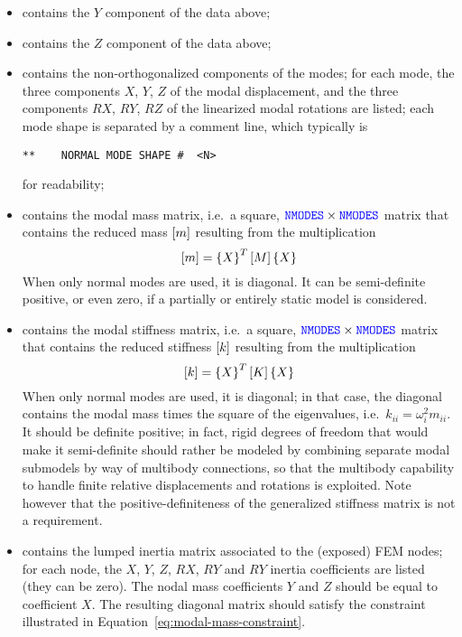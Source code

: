 \begin{itemize}
\item {} contains the $Y$ component of the data above;

\item {} contains the $Z$ component of the data above;

\item {} contains the non-orthogonalized components 
of the  modes; for each mode, the three components 
$X$, $Y$, $Z$ of the modal displacement, and the three components
$RX$, $RY$, $RZ$ of the linearized modal rotations are listed;
each mode shape is separated by a comment line, which typically is
\begin{verbatim}
**    NORMAL MODE SHAPE #  <N>
\end{verbatim}
for readability;

\item {} contains the modal mass matrix,
i.e.\ a square, $\textcolor{blue}{\texttt{NMODES}} \times \textcolor{blue}{\texttt{NMODES}}$ matrix that contains
the reduced mass $\left[ m \right]$ resulting from the multiplication
\begin{equation}
	\label{eq:modal-mass-constraint}
	\left[ m \right] = \left\{ X \right\}^T \left[ M \right] \left\{ X \right\}
\end{equation}
When only normal modes are used, it is diagonal.
It can be semi-definite positive, or even zero, if a partially 
or entirely static model is considered.

\item {} contains the modal stiffness matrix,
i.e.\ a square, $\textcolor{blue}{\texttt{NMODES}} \times \textcolor{blue}{\texttt{NMODES}}$ matrix that contains
the reduced stiffness $\left[ k \right]$ resulting from the multiplication
\begin{equation}
	\left[ k \right] = \left\{ X \right\}^T \left[ K \right] \left\{ X \right\}
\end{equation}
When only normal modes are used, it is diagonal; in that case,
the diagonal contains the modal mass times the square 
of the eigenvalues, i.e.\ $k_{ii} = \omega_i^2 m_{ii}$.
It should be definite positive; in fact, rigid degrees of freedom
that would make it semi-definite should rather be modeled by combining
separate modal submodels by way of multibody connections, so that
the multibody capability to handle finite relative displacements
and rotations is exploited.
Note however that the positive-definiteness of the generalized
stiffness matrix is not a requirement.

\item {} contains the lumped inertia matrix
associated to the  (exposed) FEM nodes;
for each node, the $X$, $Y$, $Z$, $RX$, $RY$ and $RY$ inertia
coefficients are listed (they can be zero).
The nodal mass coefficients $Y$ and $Z$ should be equal
to coefficient $X$.
The resulting diagonal matrix should satisfy the constraint
illustrated in Equation~\ref{eq:modal-mass-constraint}.


\end{itemize}

